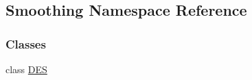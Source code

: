 \hypertarget{namespaceSmoothing}{}\subsection{Smoothing Namespace Reference}
\label{namespaceSmoothing}
\subsubsection*{Classes}
\begin{DoxyCompactItemize}
\item 
class \hyperlink{classSmoothing_1_1DES}{D\+ES}
\end{DoxyCompactItemize}
